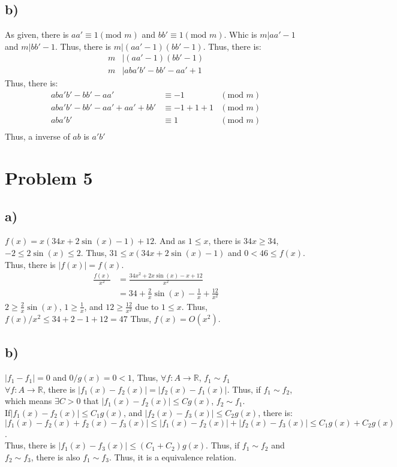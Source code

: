 \documentclass{article}
\begin{document}
\subsection*{b)}
As given, there is \(aa'\equiv 1 (\text{mod }m)\) and \(bb' \equiv 1 (\text{mod }m)\). Whic is 
\(m|aa'-1\) and \(m|bb'-1\). Thus, there is \(m|(aa'-1)(bb'-1)\). Thus, there is:
\begin{align*}
    m&|(aa'-1)(bb'-1)\\
    m&|aba'b'-bb'-aa'+1
\end{align*}
Thus, there is:
\begin{align*}
    aba'b'-bb'-aa' &\equiv -1 &(\text{mod }m)\\
    aba'b'-bb'-aa'+aa'+bb'&\equiv -1+1+1 &(\text{mod }m)\\
    aba'b'&\equiv 1 &(\text{mod }m)\\
\end{align*}
Thus, a inverse of \(ab\) is \(a'b'\)
\section*{Problem 5}
\subsection*{a)}
\(f(x)=x(34x+2\sin(x)-1)+12\). And as \(1\leqslant x\), there is \(34x\geqslant 34\), \\ \(-2\leqslant2\sin(x)\leqslant 2\).
Thus, \(31\leqslant x(34x+2\sin(x)-1)\) and \(0<46 \leqslant f(x)\). Thus, there is  \(|f(x)| = f(x)\).
\begin{align*}
    \frac{f(x)}{x^2}&=\frac{34x^2+2x\sin(x)-x+12}{x^2}\\
                    &=34+\frac{2}{x}\sin(x)-\frac{1}{x}+\frac{12}{x^2}
\end{align*}
\(2\geqslant\frac{2}{x}\sin(x)\), \(1\geqslant\frac{1}{x}\), and \(12\geqslant \frac{12}{x^2}\) due to \(1\leqslant x\). Thus, 
\(f(x)/x^2\leqslant 34+2-1+12=47\) Thus, \(f(x)=O(x^2)\).
\subsection*{b)}
\(|f_1-f_1|=0\) and \(0/g(x)=0<1\), Thus, \(\forall f:A\to \mathbb{R}\), \(f_1\sim f_1\)\\
\(\forall f:A\to \mathbb{R}\), there is \(|f_1(x)-f_2(x)|=|f_2(x)-f_1(x)|\). Thus, if \(f_1 \sim f_2 \), which means 
\(\exists C>0\) that \(|f_1(x)-f_2(x)|\leqslant Cg(x)\), \(f_2\sim f_1\).\\
If\(|f_1(x)-f_2(x)|\leqslant C_1g(x)\), and \(|f_2(x)-f_3(x)|\leqslant C_2g(x)\), there is:\\
\(|f_1(x)-f_2(x)+f_2(x)-f_3(x)|\leqslant|f_1(x)-f_2(x)|+|f_2(x)-f_3(x)|\leqslant C_1g(x)+C_2g(x)\).\\
Thus, there is \(|f_1(x)-f_3(x)|\leqslant (C_1+C_2)g(x)\). Thus, if \(f_1\sim f_2\) and \(f_2\sim f_3\), there is also 
\(f_1 \sim f_3\). Thus, it is a equivalence relation.
\end{document}
